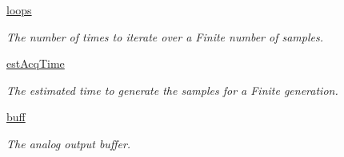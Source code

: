 \begin{DoxyCompactItemize}
\hyperlink{class_chassis_8git_1_1_analog_output_1_1_analog_output_a25cbfcf5aff7cc620b02748d12a07f39}{loops}
\begin{DoxyCompactList}\small\item\em The number of times to iterate over a Finite number of samples. \end{DoxyCompactList}\item 
\hyperlink{class_chassis_8git_1_1_analog_output_1_1_analog_output_a08a90c17370cd645157b45d891d82f74}{est\-Acq\-Time}
\begin{DoxyCompactList}\small\item\em The estimated time to generate the samples for a Finite generation. \end{DoxyCompactList}\item 
\hyperlink{class_chassis_8git_1_1_analog_output_1_1_analog_output_a3b5a60696ee0dfe637469f9087367933}{buff}
\begin{DoxyCompactList}\small\item\em The analog output buffer. \end{DoxyCompactList}\end{DoxyCompactItemize}
